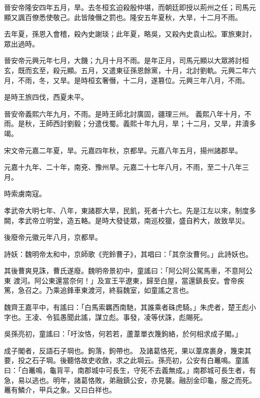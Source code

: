 \begin{pinyinscope}
 晉安帝隆安四年五月，旱。去冬桓玄迫殺殷仲堪，而朝廷即授以荊州之任；司馬元顯又諷百僚悉使敬己。此皆陵僭之罰也。隆安五年夏秋，大旱，十二月不雨。



 去年夏，孫恩入會稽，殺內史謝琰；此年夏，略吳，又殺內史袁山松。軍旅東討，眾出過時。



 晉安帝元興元年七月，大饑；九月十月不雨。是年正月，司馬元顯以大眾將討桓玄，既而玄至，殺元顯。五月，又遣東征孫恩餘黨，十月，北討劉軌。元興二年六月，不雨，冬，又旱。是時桓玄奢僭，十二月，遂篡位。元興三年八月，不雨。



 是時王旅四伐，西夏未平。



 晉安帝義熙六年九月，不雨。是時王師北討廣固，疆理三州。
 義熙八年十月，不雨。是秋，王師西討劉毅；分遣伐蜀。義熙十年九月，旱；十二月，又旱，井瀆多竭。



 宋文帝元嘉二年夏，旱。元嘉四年秋，京都旱。元嘉八年五月，揚州諸郡旱。



 元嘉十九年、二十年，南兗、豫州旱。元嘉二十七年八月，不雨，至二十八年三月。



 時索虜南寇。



 孝武帝大明七年、八年，東諸郡大旱，民飢，死者十六七。先是江左以來，制度多闕，孝武帝立明堂，造五輅。是時大發徒眾，南巡校獵，盛自矜大，故致旱災。



 後廢帝元徽元年八月，京都旱。



 詩妖：魏明帝太和中，京師歌《兜鈴曹子》，其唱曰：「其奈汝曹何。」此詩妖也。



 其後曹爽見誅，曹氏遂廢。魏明帝景初中，童謠曰：「阿公阿公駕馬車，不意阿公東
 渡河。阿公東還當奈何！」及宣王平遼東，歸至白屋，當還鎮長安。會帝疾篤，急召之。乃乘追鋒車東渡河，終翦魏室，如童謠之言也。



 魏齊王嘉平中，有謠曰：「白馬索羈西南馳，其誰乘者硃虎騎。」朱虎者，楚王彪小字也。王凌、令狐愚聞此謠，謀立彪。事發，凌等伏誅，彪賜死。



 吳孫亮初，童謠曰：「吁汝恪，何若若，蘆葦單衣篾鉤絡，於何相求成子閣。」



 成子閣者，反語石子堈也。鉤落，鉤帶也。
 及諸葛恪死，果以葦席裹身，篾束其要，投之石子堈。後聽恪故吏收斂，求之此堈云。孫亮初，公安有白鼉鳴。童謠曰：「白鼉鳴，龜背平，南郡城中可長生，守死不去義無成。」南郡城可長生者，有急，易以逃也。明年，諸葛恪敗，弟融鎮公安，亦見襲。融刮金印龜，服之而死。鼉有鱗介，甲兵之象。又曰白祥也。




\end{pinyinscope}
